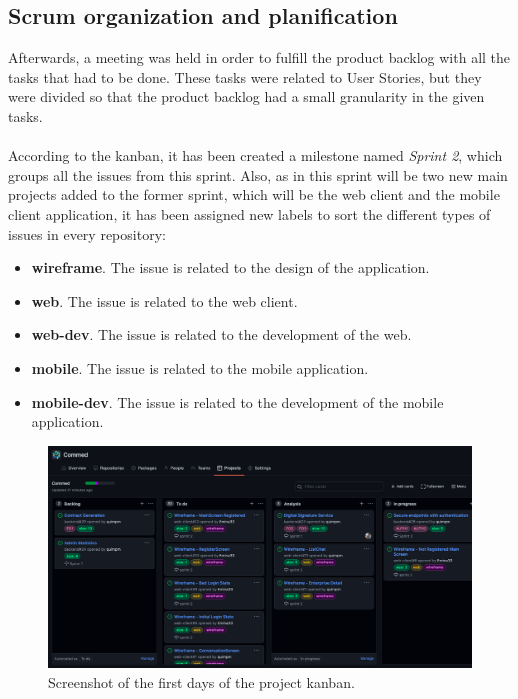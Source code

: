\documentclass[./main.tex]{subfiles}
\begin{document}
\subsection{Scrum organization and planification}
Afterwards, a meeting was held in order to fulfill the product backlog
with all the tasks that had to be done. These tasks were related to User
Stories, but they were divided so that the product backlog had a small
granularity in the given tasks.
\\
\\
According to the kanban, it has been created a milestone named \textit{Sprint 2}, which groups all the issues from this sprint. Also, as in this sprint will be two new main projects added to the former sprint, which will be the web client and the mobile client application, it has been assigned new labels to sort the different types of issues in every repository:
\begin{itemize}
	\item \textbf{wireframe}. The issue is related to the design of the application.
	\item \textbf{web}. The issue is related to the web client.
	\item \textbf{web-dev}. The issue is related to the development of the web.
	\item \textbf{mobile}. The issue is related to the mobile application.
	\item \textbf{mobile-dev}. The issue is related to the development of the mobile application.
\end{itemize}
\begin{figure}[H]
	\includegraphics[width=15cm]{img/kanban.png}
	\caption{Screenshot of the first days of the project kanban.}
\end{figure}
\end{document}
